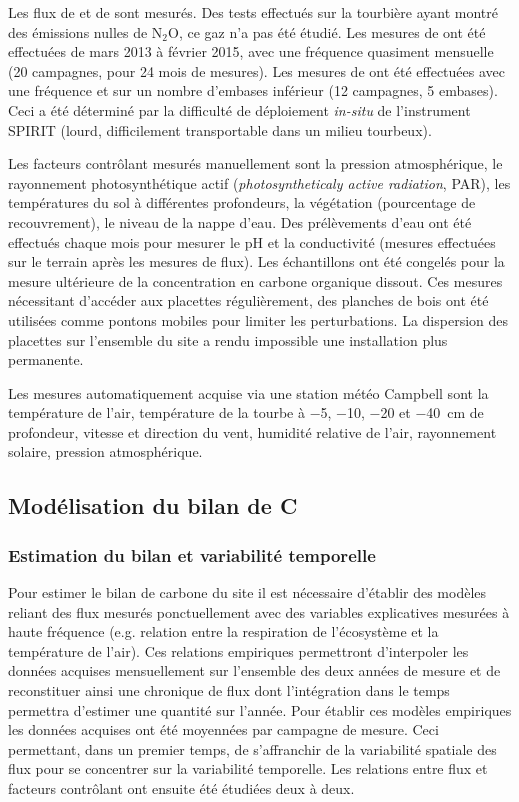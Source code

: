 Les flux de \coo et de \chh sont mesurés.
Des tests effectués sur la tourbière ayant montré des émissions nulles de N$_{2}$O, ce gaz n'a pas été étudié.
Les mesures de \coo ont été effectuées de mars 2013 à février 2015, avec une fréquence quasiment mensuelle (20 campagnes, pour 24 mois de mesures). Les mesures de \chh ont été effectuées avec une fréquence et sur un nombre d'embases inférieur (12 campagnes, 5 embases).
Ceci a été déterminé par la difficulté de déploiement \textit{in-situ} de l'instrument SPIRIT (lourd, difficilement transportable dans un milieu tourbeux).

Les facteurs contrôlant mesurés manuellement sont la pression atmosphérique, le rayonnement photosynthétique actif (\textit{photosyntheticaly active radiation}, PAR), les températures du sol à différentes profondeurs, la végétation (pourcentage de recouvrement), le niveau de la nappe d'eau.
Des prélèvements d'eau ont été effectués chaque mois pour mesurer le pH et la conductivité (mesures effectuées sur le terrain après les mesures de flux).
Les échantillons ont été congelés pour la mesure ultérieure de la concentration en carbone organique dissout.
Ces mesures nécessitant d'accéder aux placettes régulièrement, des planches de bois ont été utilisées comme pontons mobiles pour limiter les perturbations. La dispersion des placettes sur l'ensemble du site a rendu impossible une installation plus permanente.

Les mesures automatiquement acquise via une station météo Campbell sont la température de l'air, température de la tourbe à \num{-5}, \num{-10}, \num{-20} et \SI{-40}{\centi\metre} de profondeur, vitesse et direction du vent, humidité relative de l'air, rayonnement solaire, pression atmosphérique.

\subsection{Modélisation du bilan de C}

\subsubsection{Estimation du bilan et variabilité temporelle}

Pour estimer le bilan de carbone du site il est nécessaire d'établir des modèles reliant des flux mesurés ponctuellement avec des variables explicatives mesurées à haute fréquence (e.g. relation entre la respiration de l'écosystème et la température de l'air).
Ces relations empiriques permettront d'interpoler les données acquises mensuellement sur l'ensemble des deux années de mesure et de reconstituer ainsi une chronique de flux dont l'intégration dans le temps permettra d'estimer une quantité sur l'année.
Pour établir ces modèles empiriques les données acquises ont été moyennées par campagne de mesure.
Ceci permettant, dans un premier temps, de s'affranchir de la variabilité spatiale des flux pour se concentrer sur la variabilité temporelle.
Les relations entre flux et facteurs contrôlant ont ensuite été étudiées deux à deux.


